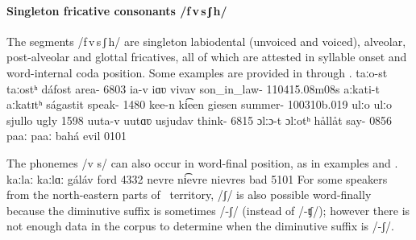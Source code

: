 \paragraph{Singleton fricative consonants /f\,v\,s\,ʃ\,h/}\label{fvssjh}
The segments \mbox{/f\,v\,s\,ʃ\,h/} are singleton labiodental (unvoiced and voiced), alveolar, post-alveolar and glottal fricatives, all of which are attested in syllable onset and word-internal coda position. %
Some examples are provided in  through .
	{taːo-st}		{taːostʰ}		{dáfost}	{area-}		{6803}
	{ia-v}	{iɑʋ}		{vivav}	{son\_in\_law-}	{110415}{.08m08s}
		{aːkati-t}	{aːkatɪtʰ}	{ságastit}	{speak-}		{1480}
	{kee-n}		{ki͡een}		{giesen}	{summer-}	{100310b}{.019}
			{ulːo}			{ulːo}			{sjullo}	{ugly\Sc{}}		{1598}
	{uuta-v}		{uutɑʋ}		{usjudav}	{think-}		{6815}
			{\Bf{h}ɔlːɔ-t}		{ɔlːotʰ}		{hållåt}	{say-}	{0856}
		{paaː}		{paaː}		{bahá}	{evil\BS{}}	{0101}

The phonemes /v s/ can also occur in word-final position, as in examples  and .%
	{kaːlaː}	{kaːlɑː}	{gáláv}	{ford\BS{}}	{4332}
		{nevre}	{ni͡evre}	{nievres}	{bad\Sc{}}	{5101}
For some speakers from the north-eastern parts of \PS\ territory, /ʃ/ is also possible word-finally because the diminutive suffix is sometimes /-ʃ/ (instead of /-ʧ/); however there is not enough data in the corpus to determine when the diminutive suffix is /-ʃ/. 

